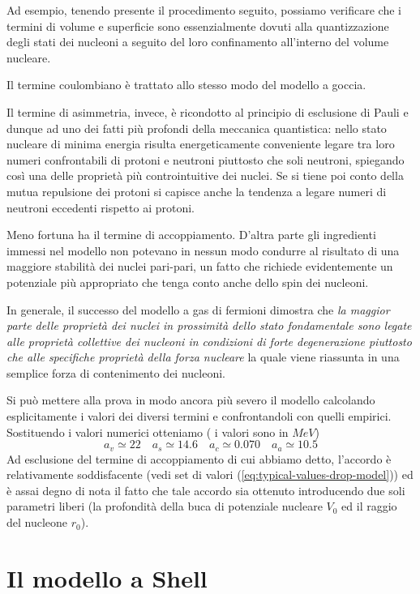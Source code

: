 Ad esempio, tenendo presente il procedimento seguito, possiamo verificare che i termini di volume e superficie sono essenzialmente dovuti alla quantizzazione degli stati dei nucleoni a seguito del loro confinamento all’interno del volume nucleare.

Il termine coulombiano è trattato allo stesso modo del modello a goccia.

Il termine di asimmetria, invece, è ricondotto al principio di esclusione di Pauli e dunque ad uno dei fatti più profondi della meccanica quantistica: nello stato nucleare di minima energia risulta energeticamente conveniente
legare tra loro numeri confrontabili di protoni e neutroni piuttosto che soli neutroni, spiegando così una delle proprietà più controintuitive dei nuclei.
Se si tiene poi conto della mutua repulsione dei protoni si capisce anche la tendenza a legare numeri di neutroni eccedenti rispetto ai protoni.

Meno fortuna ha il termine di accoppiamento.
D’altra parte gli ingredienti immessi nel modello non potevano in nessun modo condurre al risultato di una maggiore stabilità dei nuclei pari-pari, un fatto che richiede evidentemente un potenziale più appropriato che tenga conto anche dello spin dei nucleoni.

In generale, il successo del modello a gas di fermioni dimostra che
\emph{la maggior parte delle proprietà dei nuclei in prossimità dello stato fondamentale sono legate alle proprietà
collettive dei nucleoni in condizioni di forte degenerazione piuttosto che alle specifiche proprietà della forza nucleare}
la quale viene riassunta in una semplice forza di contenimento dei nucleoni.

Si può mettere alla prova in modo ancora più severo il modello calcolando esplicitamente i valori dei diversi termini e confrontandoli con quelli empirici.
Sostituendo i valori numerici otteniamo ( i valori sono in $MeV$)
\[
	a_v \simeq 22 \quad
	a_s \simeq 14.6 \quad
	a_c \simeq 0.070 \quad
	a_a \simeq 10.5
\]
Ad esclusione del termine di accoppiamento di cui abbiamo detto, l’accordo è relativamente soddisfacente
(vedi set di valori (\ref{eq:typical-values-drop-model})) ed è assai degno di nota il fatto che tale accordo sia
ottenuto introducendo due soli parametri liberi (la profondità della buca di potenziale nucleare $V_0$
ed il raggio del nucleone $r_0$).
\section{Il modello a Shell}\label{sec:il-modello-a-shell}

